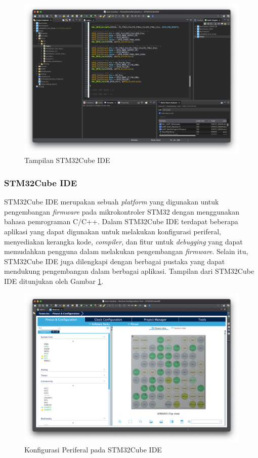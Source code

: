 \begin{figure}[H]
	\centering
	\includegraphics[width=12cm]{contents/chapter-2/stm32-ide.png}
	\caption{Tampilan STM32Cube IDE}
	\label{Fig: stm32-ide}
\end{figure}

\subsubsection{STM32Cube IDE}

STM32Cube IDE merupakan sebuah \textit{platform} yang digunakan untuk pengembangan \textit{firmware} pada mikrokontroler STM32 dengan menggunakan bahasa pemrograman C/C++. Dalam STM32Cube IDE terdapat beberapa aplikasi yang dapat digunakan untuk melakukan konfigurasi periferal, menyediakan kerangka kode, \textit{compiler}, dan fitur untuk \textit{debugging} yang dapat memudahkan pengguna dalam melakukan pengembangan \textit{firmware}. Selain itu, STM32Cube IDE juga dilengkapi dengan berbagai pustaka yang dapat mendukung pengembangan dalam berbagai aplikasi. Tampilan dari STM32Cube IDE ditunjukan oleh Gambar \ref{Fig: stm32-ide}.

\begin{figure}[H]
	\centering
	\includegraphics[width=12cm]{contents/chapter-2/stm32-mx.png}
	\caption{Konfigurasi Periferal pada STM32Cube IDE}
	\label{Fig: stm32-mx}
\end{figure}


